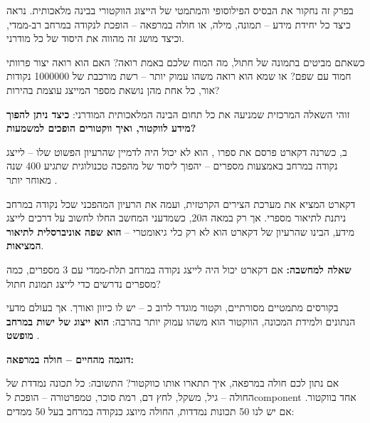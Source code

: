 

\noindent\textbf{}

\vspace{0.5cm}

בפרק זה נחקור את הבסיס הפילוסופי והמתמטי של הייצוג הווקטורי בבינה מלאכותית. נראה כיצד כל יחידת מידע – תמונה, מילה, או חולה במרפאה – הופכת לנקודה במרחב רב-ממדי, וכיצד מושג זה מהווה את היסוד של כל  מודרני.


כשאתם מביטים בתמונה של חתול, מה המוח שלכם באמת רואה? האם הוא רואה יצור פרוותי חמוד עם שפם? או שמא הוא רואה משהו עמוק יותר – רשת מורכבת של \num{1000000} נקודות אור, כל אחת מהן נושאת מספר המייצג עוצמת בהירות?

זוהי השאלה המרכזית שמניעה את כל תחום הבינה המלאכותית המודרני: \textbf{כיצד ניתן להפוך מידע לווקטור, ואיך ווקטורים הופכים למשמעות?}


ב\en{-}, כשרנה דקארט  פרסם את ספרו , הוא לא יכול היה לדמיין שהרעיון הפשוט שלו – לייצג נקודה במרחב באמצעות מספרים – יהפוך ליסוד של מהפכה טכנולוגית שתגיע \num{400} שנה מאוחר יותר \cite{strang2019}.

דקארט המציא את מערכת הצירים הקרטזית, ועמה את הרעיון המהפכני שכל נקודה במרחב ניתנת לתיאור מספרי. אך רק במאה ה\en{-}\num{20}, כשמדעני המחשב החלו לחשוב על דרכים לייצג מידע, הבינו שהרעיון של דקארט הוא לא רק כלי גיאומטרי – \textbf{הוא שפה אוניברסלית לתיאור המציאות}.

\textbf{שאלה למחשבה:} אם דקארט יכול היה לייצג נקודה במרחב תלת-ממדי עם \num{3} מספרים, כמה מספרים נדרשים כדי לייצג תמונת חתול?


בקורסים מתמטיים מסורתיים, וקטור מוגדר לרוב כ – יש לו כיוון ואורך. אך בעולם מדעי הנתונים ולמידת המכונה, הווקטור הוא משהו עמוק יותר בהרבה: \textbf{הוא ייצוג של ישות במרחב מופשט} \cite{strang2019}.

\textbf{דוגמה מהחיים – חולה במרפאה:}

אם נתון לכם חולה במרפאה, איך תתארו אותו כווקטור? התשובה: כל תכונה נמדדת של החולה – גיל, משקל, לחץ דם, רמת סוכר, טמפרטורה – הופכת ל\en{-}component אחד בווקטור. אם יש לנו \num{50} תכונות נמדדות, החולה מיוצג כנקודה במרחב בעל \num{50} ממדים:

